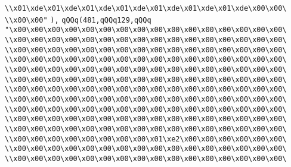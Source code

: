 \verb|\\x01\xde\x01\xde\x01\xde\x01\xde\x01\xde\x01\xde\x01\xde\x00\x00\|\newline
\verb|\\x00\x00"|\newline
\verb|),|\newline
\verb|qQQq(481,qQQq129,qQQq|\newline
\verb|"\x00\x00\x00\x00\x00\x00\x00\x00\x00\x00\x00\x00\x00\x00\x00\x00\|\newline
\verb|\\x00\x00\x00\x00\x00\x00\x00\x00\x00\x00\x00\x00\x00\x00\x00\x00\|\newline
\verb|\\x00\x00\x00\x00\x00\x00\x00\x00\x00\x00\x00\x00\x00\x00\x00\x00\|\newline
\verb|\\x00\x00\x00\x00\x00\x00\x00\x00\x00\x00\x00\x00\x00\x00\x00\x00\|\newline
\verb|\\x00\x00\x00\x00\x00\x00\x00\x00\x00\x00\x00\x00\x00\x00\x00\x00\|\newline
\verb|\\x00\x00\x00\x00\x00\x00\x00\x00\x00\x00\x00\x00\x00\x00\x00\x00\|\newline
\verb|\\x00\x00\x00\x00\x00\x00\x00\x00\x00\x00\x00\x00\x00\x00\x00\x00\|\newline
\verb|\\x00\x00\x00\x00\x00\x00\x00\x00\x00\x00\x00\x00\x00\x00\x00\x00\|\newline
\verb|\\x00\x00\x00\x00\x00\x00\x00\x00\x00\x00\x00\x00\x00\x00\x00\x00\|\newline
\verb|\\x00\x00\x00\x00\x00\x00\x00\x00\x00\x00\x00\x00\x00\x00\x00\x00\|\newline
\verb|\\x00\x00\x00\x00\x00\x00\x00\x00\x00\x00\x00\x00\x00\x00\x00\x00\|\newline
\verb|\\x00\x00\x00\x00\x00\x00\x00\x00\x01\xe2\x00\x00\x00\x00\x00\x00\|\newline
\verb|\\x00\x00\x00\x00\x00\x00\x00\x00\x00\x00\x00\x00\x00\x00\x00\x00\|\newline
\verb|\\x00\x00\x00\x00\x00\x00\x00\x00\x00\x00\x00\x00\x00\x00\x00\x00\|\newline
